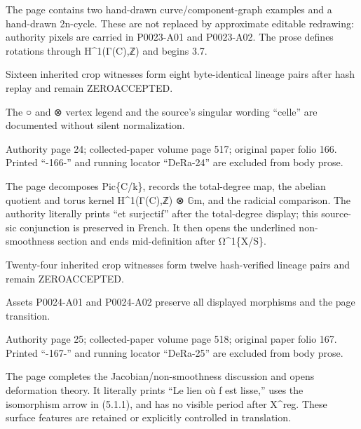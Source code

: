 \documentclass[11pt,a4paper]{article}
\begin{document}
The page contains two hand-drawn curve/component-graph examples and a hand-drawn 2n-cycle. These are not replaced by approximate editable redrawing: authority pixels are carried in P0023-A01 and P0023-A02. The prose defines rotations through H\textasciicircum{}1(Γ(C),ℤ) and begins 3.7.

Sixteen inherited crop witnesses form eight byte-identical lineage pairs after hash replay and remain ZERO\textunderscore{}ACCEPTED.

The ○ and ⊗ vertex legend and the source's singular wording “celle” are documented without silent normalization.


\par\medskip
\hypertarget{D018-P0024}{}
\par\smallskip
Authority page 24; collected-paper volume page 517; original paper folio 166. Printed “-166-” and running locator “DeRa-24” are excluded from body prose.

The page decomposes Pic\textunderscore{}\{C/k\}, records the total-degree map, the abelian quotient and torus kernel H\textasciicircum{}1(Γ(C),ℤ) ⊗ \ensuremath{\mathbb{G}}\textunderscore{}m, and the radicial comparison. The authority literally prints “et surjectif” after the total-degree display; this source-sic conjunction is preserved in French. It then opens the underlined non-smoothness section and ends mid-definition after Ω\textasciicircum{}1\textunderscore{}\{X/S\}.

Twenty-four inherited crop witnesses form twelve hash-verified lineage pairs and remain ZERO\textunderscore{}ACCEPTED.

Assets P0024-A01 and P0024-A02 preserve all displayed morphisms and the page transition.


\par\medskip
\hypertarget{D018-P0025}{}
\par\smallskip
Authority page 25; collected-paper volume page 518; original paper folio 167. Printed “-167-” and running locator “DeRa-25” are excluded from body prose.

The page completes the Jacobian/non-smoothness discussion and opens deformation theory. It literally prints “Le lien où f est lisse,” uses the isomorphism arrow in (5.1.1), and has no visible period after X\textasciicircum{}reg. These surface features are retained or explicitly controlled in translation.
\end{document}
